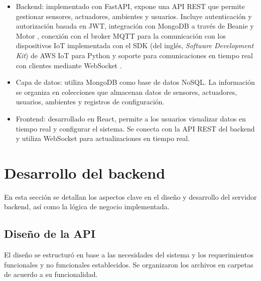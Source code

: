 \begin{itemize}
    \item Backend: implementado con FastAPI, expone una API REST que permite gestionar
          sensores, actuadores, ambientes y usuarios. Incluye autenticación y
          autorización basada en JWT, integración con MongoDB a través de Beanie
          \cite{BeaniODM} y Motor \cite{MotorMongoDB}, conexión con el broker MQTT para
          la comunicación con los dispositivos IoT implementada con el SDK (del inglés,
          \textit{Software Development Kit}) de AWS IoT para Python \cite{AWSIoTSDK} y
          soporte para comunicaciones en tiempo real con clientes mediante WebSocket
          \cite{FastAPIWebSockets}.

    \item Capa de datos: utiliza MongoDB como base de datos NoSQL. La información se
          organiza en colecciones que almacenan datos de sensores, actuadores, usuarios,
          ambientes y registros de configuración.

    \item Frontend: desarrollado en React, permite a los usuarios visualizar datos en
          tiempo real y configurar el sistema. Se conecta con la API REST del backend y
          utiliza WebSocket \cite{SocketIO} para actualizaciones en tiempo real.
\end{itemize}

\section{Desarrollo del backend}

En esta sección se detallan los aspectos clave en el diseño y desarrollo del
servidor backend, así como la lógica de negocio implementada.

\subsection{Diseño de la API}

El diseño se estructuró en base a las necesidades del sistema y los
requerimientos funcionales y no funcionales establecidos. Se organizaron los
archivos en carpetas de acuerdo a su funcionalidad. %

